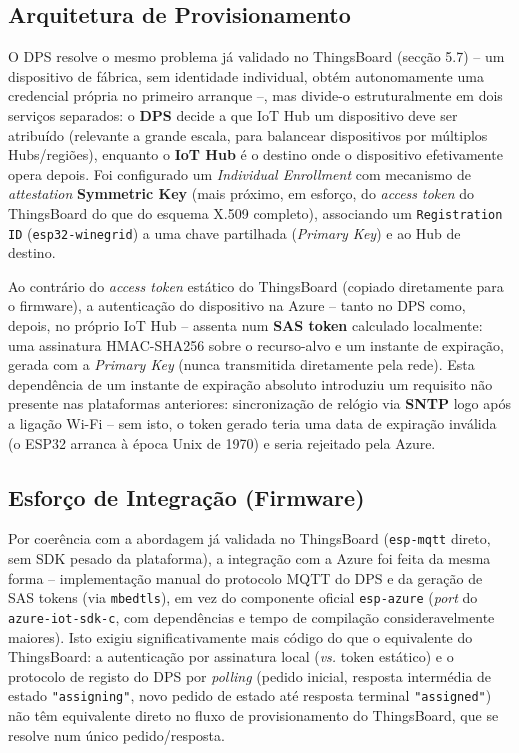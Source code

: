 \documentclass[a4paper,12pt]{article}
\begin{document}
\subsection{Arquitetura de Provisionamento}
O DPS resolve o mesmo problema já validado no ThingsBoard (secção 5.7) -- um dispositivo de fábrica, sem identidade individual, obtém autonomamente uma credencial própria no primeiro arranque --, mas divide-o estruturalmente em dois serviços separados: o \textbf{DPS} decide a que IoT Hub um dispositivo deve ser atribuído (relevante a grande escala, para balancear dispositivos por múltiplos Hubs/regiões), enquanto o \textbf{IoT Hub} é o destino onde o dispositivo efetivamente opera depois. Foi configurado um \textit{Individual Enrollment} com mecanismo de \textit{attestation} \textbf{Symmetric Key} (mais próximo, em esforço, do \textit{access token} do ThingsBoard do que do esquema X.509 completo), associando um \texttt{Registration ID} (\texttt{esp32-winegrid}) a uma chave partilhada (\textit{Primary Key}) e ao Hub de destino.

Ao contrário do \textit{access token} estático do ThingsBoard (copiado diretamente para o firmware), a autenticação do dispositivo na Azure -- tanto no DPS como, depois, no próprio IoT Hub -- assenta num \textbf{SAS token} calculado localmente: uma assinatura HMAC-SHA256 sobre o recurso-alvo e um instante de expiração, gerada com a \textit{Primary Key} (nunca transmitida diretamente pela rede). Esta dependência de um instante de expiração absoluto introduziu um requisito não presente nas plataformas anteriores: sincronização de relógio via \textbf{SNTP} logo após a ligação Wi-Fi -- sem isto, o token gerado teria uma data de expiração inválida (o ESP32 arranca à época Unix de 1970) e seria rejeitado pela Azure.

\subsection{Esforço de Integração (Firmware)}
Por coerência com a abordagem já validada no ThingsBoard (\texttt{esp-mqtt} direto, sem SDK pesado da plataforma), a integração com a Azure foi feita da mesma forma -- implementação manual do protocolo MQTT do DPS e da geração de SAS tokens (via \texttt{mbedtls}), em vez do componente oficial \texttt{esp-azure} (\textit{port} do \texttt{azure-iot-sdk-c}, com dependências e tempo de compilação consideravelmente maiores). Isto exigiu significativamente mais código do que o equivalente do ThingsBoard: a autenticação por assinatura local (\textit{vs.} token estático) e o protocolo de registo do DPS por \textit{polling} (pedido inicial, resposta intermédia de estado \texttt{"assigning"}, novo pedido de estado até resposta terminal \texttt{"assigned"}) não têm equivalente direto no fluxo de provisionamento do ThingsBoard, que se resolve num único pedido/resposta.
\end{document}
